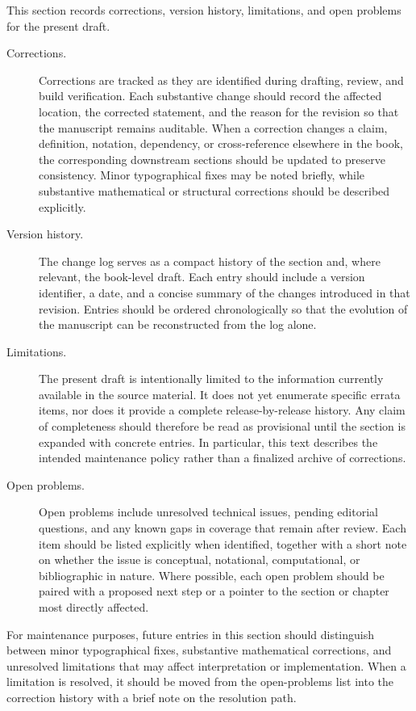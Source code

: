 This section records corrections, version history, limitations, and open problems for the present draft.

\begin{description}
  \item[Corrections.] Corrections are tracked as they are identified during drafting, review, and build verification. Each substantive change should record the affected location, the corrected statement, and the reason for the revision so that the manuscript remains auditable. When a correction changes a claim, definition, notation, dependency, or cross-reference elsewhere in the book, the corresponding downstream sections should be updated to preserve consistency. Minor typographical fixes may be noted briefly, while substantive mathematical or structural corrections should be described explicitly.

  \item[Version history.] The change log serves as a compact history of the section and, where relevant, the book-level draft. Each entry should include a version identifier, a date, and a concise summary of the changes introduced in that revision. Entries should be ordered chronologically so that the evolution of the manuscript can be reconstructed from the log alone.

  \item[Limitations.] The present draft is intentionally limited to the information currently available in the source material. It does not yet enumerate specific errata items, nor does it provide a complete release-by-release history. Any claim of completeness should therefore be read as provisional until the section is expanded with concrete entries. In particular, this text describes the intended maintenance policy rather than a finalized archive of corrections.

  \item[Open problems.] Open problems include unresolved technical issues, pending editorial questions, and any known gaps in coverage that remain after review. Each item should be listed explicitly when identified, together with a short note on whether the issue is conceptual, notational, computational, or bibliographic in nature. Where possible, each open problem should be paired with a proposed next step or a pointer to the section or chapter most directly affected.
\end{description}

For maintenance purposes, future entries in this section should distinguish between minor typographical fixes, substantive mathematical corrections, and unresolved limitations that may affect interpretation or implementation. When a limitation is resolved, it should be moved from the open-problems list into the correction history with a brief note on the resolution path.

